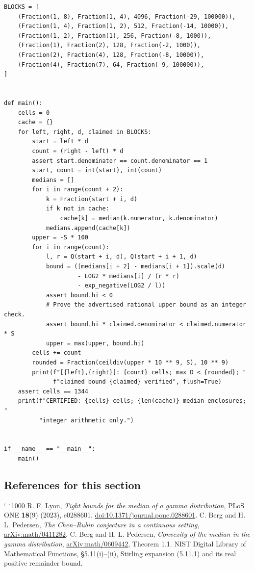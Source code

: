 \documentclass[11pt,a4paper]{article}
\makeatletter
\numberwithin{equation}{section}
\theoremstyle{definition}
\theoremstyle{remark}
\renewenvironment{thebibliography}[1]
 {\subsection*{References for this section}\small
  \list{\@biblabel{\@arabic\c@enumiv}}
       {\settowidth\labelwidth{\@biblabel{#1}}\leftmargin\labelwidth
        \advance\leftmargin\labelsep\@openbib@code
        \usecounter{enumiv}\let\p@enumiv\@empty
        \renewcommand\theenumiv{\@arabic\c@enumiv}}
  \sloppy\clubpenalty4000\widowpenalty4000\sfcode`\.=1000\relax}
 {\def\@noitemerr{\@latex@warning{Empty bibliography}}\endlist}
\makeatother
\begin{document}
\begin{Verbatim}
BLOCKS = [
    (Fraction(1, 8), Fraction(1, 4), 4096, Fraction(-29, 100000)),
    (Fraction(1, 4), Fraction(1, 2), 512, Fraction(-14, 10000)),
    (Fraction(1, 2), Fraction(1), 256, Fraction(-8, 1000)),
    (Fraction(1), Fraction(2), 128, Fraction(-2, 1000)),
    (Fraction(2), Fraction(4), 128, Fraction(-8, 10000)),
    (Fraction(4), Fraction(7), 64, Fraction(-9, 100000)),
]


def main():
    cells = 0
    cache = {}
    for left, right, d, claimed in BLOCKS:
        start = left * d
        count = (right - left) * d
        assert start.denominator == count.denominator == 1
        start, count = int(start), int(count)
        medians = []
        for i in range(count + 2):
            k = Fraction(start + i, d)
            if k not in cache:
                cache[k] = median(k.numerator, k.denominator)
            medians.append(cache[k])
        upper = -S * 100
        for i in range(count):
            l, r = Q(start + i, d), Q(start + i + 1, d)
            bound = ((medians[i + 2] - medians[i + 1]).scale(d)
                     - LOG2 * medians[i] / (r * r)
                     - exp_negative(LOG2 / l))
            assert bound.hi < 0
            # Prove the advertised rational upper bound as an integer check.
            assert bound.hi * claimed.denominator < claimed.numerator * S
            upper = max(upper, bound.hi)
        cells += count
        rounded = Fraction(ceildiv(upper * 10 ** 9, S), 10 ** 9)
        print(f"[{left},{right}]: {count} cells; max D < {rounded}; "
              f"claimed bound {claimed} verified", flush=True)
    assert cells == 1344
    print(f"CERTIFIED: {cells} cells; {len(cache)} median enclosures; "
          "integer arithmetic only.")


if __name__ == "__main__":
    main()
\end{Verbatim}


\begin{thebibliography}{9}
 R. F. Lyon,
\emph{Tight bounds for the median of a gamma distribution},
PLoS ONE \textbf{18}(9) (2023), e0288601.
\href{https://doi.org/10.1371/journal.pone.0288601}{doi:10.1371/journal.pone.0288601}.
 C. Berg and H. L. Pedersen,
\emph{The Chen--Rubin conjecture in a continuous setting},
\href{https://arxiv.org/abs/math/0411282}{arXiv:math/0411282}.
 C. Berg and H. L. Pedersen,
\emph{Convexity of the median in the gamma distribution},
\href{https://arxiv.org/abs/math/0609442}{arXiv:math/0609442}, Theorem 1.1.
 NIST Digital Library of Mathematical Functions,
\href{https://dlmf.nist.gov/5.11}{\S5.11(i)--(ii)},
Stirling expansion (5.11.1) and its real positive remainder bound.
\end{thebibliography}
\end{document}
